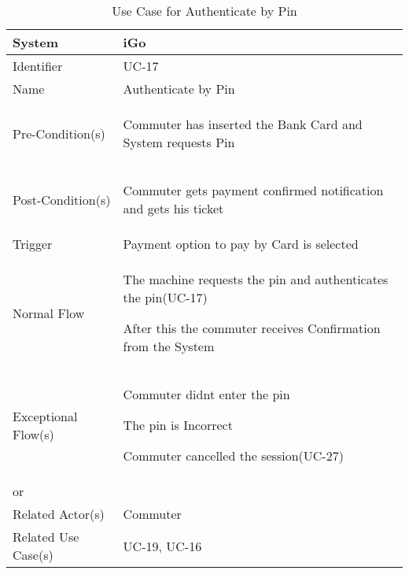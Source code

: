 \begin{table}[ht]
    \centering
    \begin{tabular}{|l|p{11cm}|}
        \hline
        System             & iGo\\
        \hline
        Identifier         & UC-17 \\
        \hline
        Name               & Authenticate by Pin \\
        \hline
        Pre-Condition(s)   & 
        \begin{enumerate*}[itemjoin=\newline]
            \item Commuter has inserted the Bank Card and System requests Pin
        \end{enumerate*} \\
        \hline
        Post-Condition(s)  & 
        \begin{enumerate*}[itemjoin=\newline]
            \item Commuter gets payment confirmed notification and gets his ticket
        \end{enumerate*} \\
        \hline
        Trigger            & Payment option to pay by Card is selected \\
        \hline
        Normal Flow        & 
        \begin{enumerate*}[itemjoin=\newline]
            \item The machine requests the pin and authenticates the pin(UC-17)
            \item After this the commuter receives Confirmation from the System
        \end{enumerate*} \\
        \hline
        Exceptional Flow(s)& 
        \begin{enumerate*}[itemjoin=\newline]
            \item Commuter didnt enter the pin
            \item The pin is Incorrect
            \item Commuter cancelled the session(UC-27)
        \end{enumerate*} \\ or \\
        \hline
        Related Actor(s)   & Commuter \\
        \hline
        Related Use Case(s)&  UC-19, UC-16\\
        \hline
    \end{tabular}
    \caption{Use Case for Authenticate by Pin}
    \label{tab:UC_AuthenticateByPin}
\end{table}
